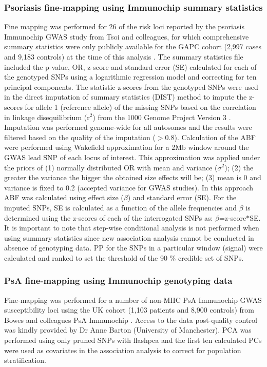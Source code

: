 \subsubsection{Psoriasis fine-mapping using Immunochip summary statistics}
Fine mapping was performed for 26 of the risk loci reported by the psoriasis Immunochip GWAS study from Tsoi and colleagues, for which comprehensive summary statistics were only publicly available for the GAPC cohort (2,997 cases and 9,183 controls) at the time of this analysis \parencite{Tsoi2012}. The summary statistics file included the p-value, OR, z-score and standard error (SE) calculated for each of the genotyped SNPs using a logarithmic regression model and correcting for ten principal components. The statistic z-scores from the genotyped SNPs were used in the direct imputation of summary statistics (DIST) method to impute the z-scores for allele 1 (reference allele) of the missing SNPs based on the correlation in linkage disequilibrium (r$^2$) from the 1000 Genome Project Version 3 \parencite{Lee2013}. Imputation was performed genome-wide for all autosomes and the results were filtered based on the quality of the imputation ($>$0.8). Calculation of the ABF were performed using Wakefield approximation for a 2Mb window around the GWAS lead SNP of each locus of interest. This approximation was applied under the priors of (1) normally distributed OR with mean and variance ($\sigma^2$); (2) the greater the variance the bigger the obtained size effects will be; (3) mean is 0 and variance is fixed to 0.2 (accepted variance for GWAS studies). In this approach ABF was calculated using effect size ($\beta$) and standard error (SE). For the imputed SNPs, SE is calculated as a function of the allele frequencies and $\beta$ is determined using the z-scores of each of the interrogated SNPs as: $\beta$=z-score$\ast$SE. It is important to note that step-wise conditional analysis is not performed when using summary statistics since new association analysis cannot be conducted in absence of genotyping data. PP for the SNPs in a particular window (signal) were calculated and ranked to set the threshold of the 90 \% credible set of SNPs. 

\subsubsection{PsA fine-mapping using Immunochip genotyping data}
Fine-mapping was performed for a number of non-MHC PsA Immunochip GWAS susceptibility loci using the UK cohort (1,103 patients and 8,900 controls) from Bowes and colleagues PsA Immunochip \parencite{Bowes2015}. Access to the data post-quality control was kindly provided by Dr Anne Barton (University of Manchester). PCA was performed using only pruned SNPs with flashpca \parencite{Abraham2014} and the first ten calculated PCs were used as covariates in the association analysis to correct for population stratification. 

